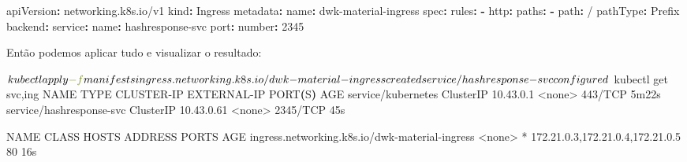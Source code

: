 \documentclass[
]{article}
\newenvironment{Shaded}{}{}
\newcommand{\AttributeTok}[1]{\textcolor[rgb]{0.49,0.56,0.16}{#1}}
\newcommand{\DecValTok}[1]{\textcolor[rgb]{0.25,0.63,0.44}{#1}}
\newcommand{\ErrorTok}[1]{\textcolor[rgb]{1.00,0.00,0.00}{\textbf{#1}}}
\newcommand{\ExtensionTok}[1]{#1}
\newcommand{\FunctionTok}[1]{\textcolor[rgb]{0.02,0.16,0.49}{#1}}
\newcommand{\KeywordTok}[1]{\textcolor[rgb]{0.00,0.44,0.13}{\textbf{#1}}}
\newcommand{\NormalTok}[1]{#1}
\newcommand{\OperatorTok}[1]{\textcolor[rgb]{0.40,0.40,0.40}{#1}}
\newcommand{\PreprocessorTok}[1]{\textcolor[rgb]{0.74,0.48,0.00}{#1}}
\begin{document}
\begin{Shaded}
\begin{Highlighting}[]
\FunctionTok{apiVersion}\KeywordTok{:}\AttributeTok{ networking.k8s.io/v1}
\FunctionTok{kind}\KeywordTok{:}\AttributeTok{ Ingress}
\FunctionTok{metadata}\KeywordTok{:}
\AttributeTok{  }\FunctionTok{name}\KeywordTok{:}\AttributeTok{ dwk{-}material{-}ingress}
\FunctionTok{spec}\KeywordTok{:}
\AttributeTok{  }\FunctionTok{rules}\KeywordTok{:}
\AttributeTok{  }\KeywordTok{{-}}\AttributeTok{ }\FunctionTok{http}\KeywordTok{:}
\AttributeTok{      }\FunctionTok{paths}\KeywordTok{:}
\AttributeTok{      }\KeywordTok{{-}}\AttributeTok{ }\FunctionTok{path}\KeywordTok{:}\AttributeTok{ /}
\AttributeTok{        }\FunctionTok{pathType}\KeywordTok{:}\AttributeTok{ Prefix}
\AttributeTok{        }\FunctionTok{backend}\KeywordTok{:}
\AttributeTok{          }\FunctionTok{service}\KeywordTok{:}
\AttributeTok{            }\FunctionTok{name}\KeywordTok{:}\AttributeTok{ hashresponse{-}svc}
\AttributeTok{            }\FunctionTok{port}\KeywordTok{:}
\AttributeTok{              }\FunctionTok{number}\KeywordTok{:}\AttributeTok{ }\DecValTok{2345}
\end{Highlighting}
\end{Shaded}

Então podemos aplicar tudo e visualizar o resultado:

\begin{Shaded}
\begin{Highlighting}[]
\ExtensionTok{$}\NormalTok{ kubectl apply }\AttributeTok{{-}f}\NormalTok{ manifests}
\ExtensionTok{ingress.networking.k8s.io/dwk{-}material{-}ingress}\NormalTok{ created}
\ExtensionTok{service/hashresponse{-}svc}\NormalTok{ configured}

\ExtensionTok{$}\NormalTok{ kubectl get svc,ing}
\ExtensionTok{NAME}\NormalTok{                       TYPE        CLUSTER{-}IP   EXTERNAL{-}IP   PORT}\ErrorTok{(}\ExtensionTok{S}\KeywordTok{)}    \ExtensionTok{AGE}
\ExtensionTok{service/kubernetes}\NormalTok{         ClusterIP   10.43.0.1    }\OperatorTok{\textless{}}\NormalTok{none}\OperatorTok{\textgreater{}}\NormalTok{        443/TCP    5m22s}
\ExtensionTok{service/hashresponse{-}svc}\NormalTok{   ClusterIP   10.43.0.61   }\OperatorTok{\textless{}}\NormalTok{none}\OperatorTok{\textgreater{}}\NormalTok{        2345/TCP   45s}

\ExtensionTok{NAME}\NormalTok{                                             CLASS    HOSTS   ADDRESS                            PORTS   AGE}
\ExtensionTok{ingress.networking.k8s.io/dwk{-}material{-}ingress}   \OperatorTok{\textless{}}\NormalTok{none}\OperatorTok{\textgreater{}}   \PreprocessorTok{*}\NormalTok{       172.21.0.3,172.21.0.4,172.21.0.5   80      16s}
\end{Highlighting}
\end{Shaded}
\end{document}
